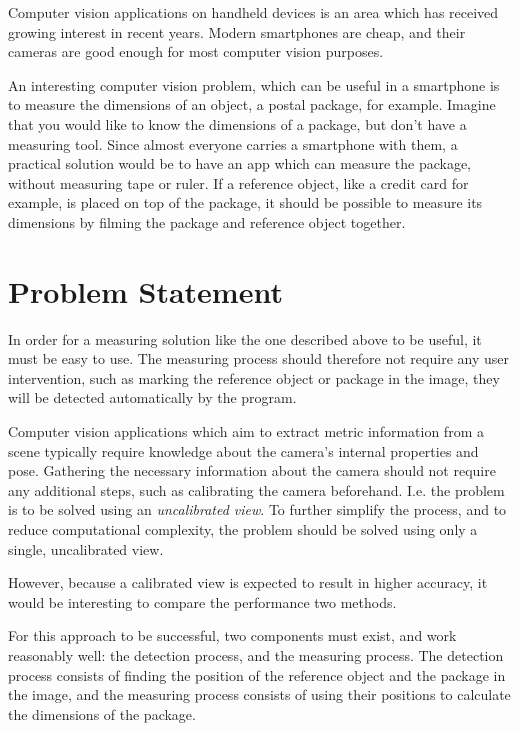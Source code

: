 Computer vision applications on handheld devices is an area which has received growing interest in recent years. 
Modern smartphones are cheap, and their cameras are good enough for most computer vision purposes.

An interesting computer vision problem, which can be useful in a smartphone is to measure the dimensions of an object, a postal package, for example.
Imagine that you would like to know the dimensions of a package, but don't have a measuring tool.
Since almost everyone carries a smartphone with them, a practical solution would be to have an app which can measure the package, without measuring tape or ruler.
If a reference object, like a credit card for example, is placed on top of the package, it should be possible to measure its dimensions by filming the package and reference object together.

\section{Problem Statement}\label{problem-statement}
In order for a measuring solution like the one described above to be useful, it must be easy to use. 
The measuring process should therefore not require any user intervention, such as marking the reference object or package in the image, they will be detected automatically by the program.

Computer vision applications which aim to extract metric information from a scene typically require knowledge about the camera's internal properties and pose.
Gathering the necessary information about the camera should not require any additional steps, such as calibrating the camera beforehand.
I.e. the problem is to be solved using an \textit{uncalibrated view}.
To further simplify the process, and to reduce computational complexity, the problem should be solved using only a single, uncalibrated view.

However, because a calibrated view is expected to result in higher accuracy, it would be interesting to compare the performance two methods.

For this approach to be successful, two components must exist, and work reasonably well: the detection process, and the measuring process.
The detection process consists of finding the position of the reference object and the package in the image, and the measuring process consists of using their positions to calculate the dimensions of the package.


